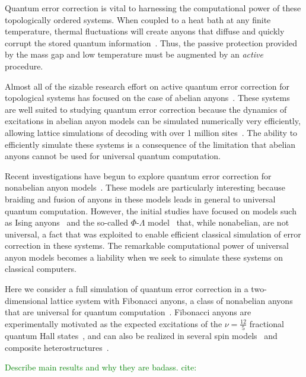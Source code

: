 \documentclass[aps, prl, letterpaper, twocolumn, superscriptaddress, notitlepage, 10pt]{revtex4-1}
\newcommand{\stf}[1]{\textcolor{green}{#1}}
\begin{document}
Quantum error correction is vital to harnessing the computational power of these topologically 
ordered systems. When coupled to a heat bath at any finite temperature, thermal fluctuations 
will create anyons that diffuse and quickly corrupt the stored quantum 
information~\cite{Pastawski2010}. Thus, the passive protection provided by the mass gap 
and low temperature must be augmented by an \emph{active} procedure. 

Almost all of the sizable research effort on active quantum error correction for topological 
systems has focused on the case of abelian anyons~\cite{Terhal2014}. These systems are 
well suited to studying quantum error correction because the dynamics of excitations in 
abelian anyon models can be simulated numerically very efficiently, allowing lattice 
simulations of decoding with over 1 million sites~\cite{Duclos-Cianci2010}. The ability to 
efficiently simulate these systems is a consequence of the limitation that abelian anyons 
cannot be used for universal quantum computation. 

Recent investigations have begun to explore quantum error correction for nonabelian anyon 
models~\cite{Brell2013, Wootton2013, Hutter2014}. These models are particularly interesting 
because braiding and fusion of anyons in these models leads in general to universal quantum 
computation. However, the initial studies have focused on models such as Ising 
anyons~\cite{Brell2013} and the so-called $\Phi$-$\Lambda$ 
model~\cite{Wootton2013, Hutter2014} that, while nonabelian, are not universal, a fact 
that was exploited to enable efficient classical simulation of error correction in these systems. 
The remarkable computational power of universal anyon models becomes a liability when we 
seek to simulate these systems on classical computers. 

Here we consider a full simulation of quantum error correction in a two-dimensional lattice 
system with Fibonacci anyons, a class of nonabelian anyons that are universal for quantum 
computation~\cite{Wang2010b}. Fibonacci anyons are experimentally motivated as the 
expected excitations of the $\nu=\frac{12}{5}$ fractional quantum Hall 
states~\cite{Slingerland2001}, and can also be realized in several spin 
models~\cite{Levin2005, Kapit2013, Palumbo2014} and composite 
heterostructures~\cite{Mong2014}.

\stf{Describe main results and why they are badass. cite:~\cite{Bonesteel2012}}

\end{document}
